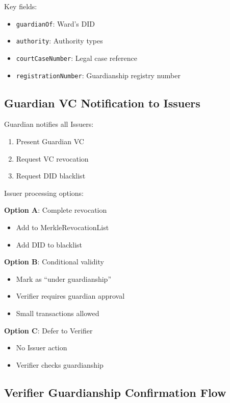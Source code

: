 Key fields:
\begin{itemize}
  \item \texttt{guardianOf}: Ward's DID
  \item \texttt{authority}: Authority types
  \item \texttt{courtCaseNumber}: Legal case reference
  \item \texttt{registrationNumber}: Guardianship registry number
\end{itemize}

\subsection{Guardian VC Notification to Issuers}

Guardian notifies all Issuers:

\begin{enumerate}
  \item Present Guardian VC
  \item Request VC revocation
  \item Request DID blacklist
\end{enumerate}

Issuer processing options:

\textbf{Option A}: Complete revocation
\begin{itemize}
  \item Add to MerkleRevocationList
  \item Add DID to blacklist
\end{itemize}

\textbf{Option B}: Conditional validity
\begin{itemize}
  \item Mark as ``under guardianship''
  \item Verifier requires guardian approval
  \item Small transactions allowed
\end{itemize}

\textbf{Option C}: Defer to Verifier
\begin{itemize}
  \item No Issuer action
  \item Verifier checks guardianship
\end{itemize}

\subsection{Verifier Guardianship Confirmation Flow}

